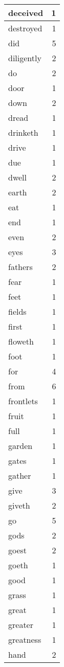 \begin{center}
\begin{longtable}{l|r}
deceived & 1 \\ \hline
destroyed & 1 \\ \hline
did & 5 \\ \hline
diligently & 2 \\ \hline
do & 2 \\ \hline
door & 1 \\ \hline
down & 2 \\ \hline
dread & 1 \\ \hline
drinketh & 1 \\ \hline
drive & 1 \\ \hline
due & 1 \\ \hline
dwell & 2 \\ \hline
earth & 2 \\ \hline
eat & 1 \\ \hline
end & 1 \\ \hline
even & 2 \\ \hline
eyes & 3 \\ \hline
fathers & 2 \\ \hline
fear & 1 \\ \hline
feet & 1 \\ \hline
fields & 1 \\ \hline
first & 1 \\ \hline
floweth & 1 \\ \hline
foot & 1 \\ \hline
for & 4 \\ \hline
from & 6 \\ \hline
frontlets & 1 \\ \hline
fruit & 1 \\ \hline
full & 1 \\ \hline
garden & 1 \\ \hline
gates & 1 \\ \hline
gather & 1 \\ \hline
give & 3 \\ \hline
giveth & 2 \\ \hline
go & 5 \\ \hline
gods & 2 \\ \hline
goest & 2 \\ \hline
goeth & 1 \\ \hline
good & 1 \\ \hline
grass & 1 \\ \hline
great & 1 \\ \hline
greater & 1 \\ \hline
greatness & 1 \\ \hline
hand & 2 \\ \hline

\end{longtable}
\end{center}
